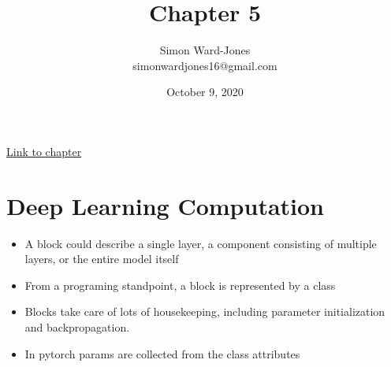\documentclass[12pt,notitlepage]{article}
\begin{document}


\title{\Large{\textbf{Chapter 5}}}
\date{October 9, 2020}
\author{Simon Ward-Jones\\simonwardjones16@gmail.com}

\maketitle
\href{https://d2l.ai/chapter_deep-learning-computation/index.html}{Link to chapter}

\section{Deep Learning Computation}
\begin{itemize}
    \item A block could describe a single layer, a component consisting of multiple layers, or the entire model itself
    \item From a programing standpoint, a block is represented by a class
    \item Blocks take care of lots of housekeeping, including parameter initialization and backpropagation.
    \item In pytorch params are collected from the class attributes
\end{itemize}

\vfill

\nocite{zhang2020dive}
\end{document}
